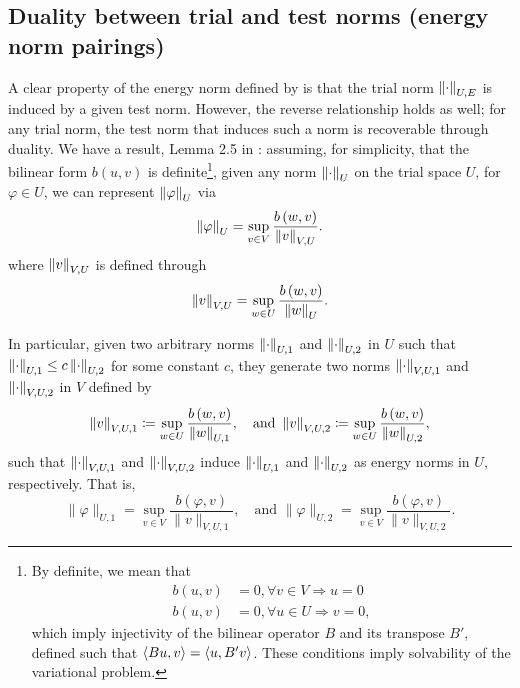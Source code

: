 \subsection{Duality between trial and test norms (energy norm pairings)}
A clear property of the energy norm defined by  is that the trial norm $\nor{\cdot}_{U,E}$ is induced by a given test norm. However, the reverse relationship holds as well; for any trial norm, the test norm that induces such a norm is recoverable through duality. We have a result, Lemma 2.5 in \cite{Bui-ThanhDemkowiczGhattas11a}: assuming, for simplicity, that the bilinear form $b(u,v)$ is definite\footnote{By definite, we mean that \begin{align*}b(u,v) &= 0, \forall v\in V \Rightarrow u = 0\\ b(u,v)&=0, \forall u\in U \Rightarrow v = 0,\end{align*}  which imply injectivity of the bilinear operator $B$ and its transpose $B'$, defined such that $\LRa{Bu,v} = \LRa{u,B'v}$.  These conditions imply solvability of the variational problem.}, given any norm $\nor{\cdot}_{U}$ on the trial space $U$, for $\varphi \in U$, we can represent $\nor{\varphi}_{U}$ via
\[
\nor{\varphi}_{U} = \sup_{v \in V}\frac{b\LRp{w,v}}{\nor{v}_{V,U}}.
\]
where $\nor{v}_{V,U}$ is defined through
\[
\nor{v}_{V,U} = \sup_{w \in U}\frac{b\LRp{w,v}}{\nor{w}_{U}}.
\]

In particular, given two arbitrary norms $\nor{\cdot}_{U,1}$ and $\nor{\cdot}_{U,2}$ in $U$
such that $\nor{\cdot}_{U,1} \le c \nor{\cdot}_{U,2}$ for some constant
$c$, they generate two norms $\nor{\cdot}_{V,U,1}$ and
$\nor{\cdot}_{V,U,2}$ in $V$ defined by
\[
\nor{v}_{V,U,1} \coloneqq \sup_{w \in U}\frac{b\LRp{w,v}}{\nor{w}_{U,1}}, \quad
\text{and }\nor{v}_{V,U,2} \coloneqq \sup_{w \in U}\frac{b\LRp{w,v}}{\nor{w}_{U,2}},
\]
such that $\nor{\cdot}_{V,U,1}$ and $\nor{\cdot}_{V,U,2}$ induce
$\nor{\cdot}_{U,1}$ and $\nor{\cdot}_{U,2}$ as energy
norms in $U$, respectively. That is,
\[
\|\varphi\|_{U,1} = \sup_{v\in V}
\frac{b(\varphi,v)}{\|v\|_{V,U,1}}, \quad \text{and }\|\varphi\|_{U,2} = \sup_{v\in V}
\frac{b(\varphi,v)}{\|v\|_{V,U,2}}.
\]

